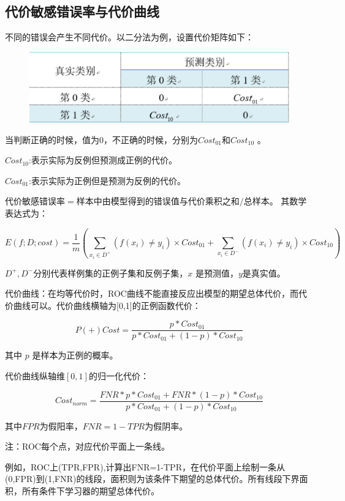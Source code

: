 \subsection{代价敏感错误率与代价曲线}

不同的错误会产生不同代价。以二分法为例，设置代价矩阵如下：

 \begin{figure}[h]
   \centering
   \includegraphics[width=.7\textwidth]{imgs/2-1.eps}
 \end{figure}

当判断正确的时候，值为$0$，不正确的时候，分别为$Cost_{01}$和$Cost_{10}$ 。

$Cost_{10}$:表示实际为反例但预测成正例的代价。

$Cost_{01}$:表示实际为正例但是预测为反例的代价。


$\mbox{代价敏感错误率} = \mbox{样本中由模型得到的错误值与代价乘积之和}/\mbox{总样本}$。 其数学表达式为：

$$
E(f;D;cost)=\frac{1}{m}\left( \sum_{x_{i} \in D^{+}}({f(x_i)\neq y_i})\times Cost_{01}+ \sum_{x_{i} \in D^{-}}({f(x_i)\neq y_i})\times Cost_{10}\right)
$$

$D^{+},D^{-}$分别代表样例集的正例子集和反例子集，$x$ 是预测值，$y$是真实值。


代价曲线：在均等代价时，ROC曲线不能直接反应出模型的期望总体代价，而代价曲线可以。代价曲线横轴为[0,1]的正例函数代价：

$$
P(+)Cost=\frac{p*Cost_{01}}{p*Cost_{01}+(1-p)*Cost_{10}}
$$

其中 $p$ 是样本为正例的概率。

代价曲线纵轴维$[0,1]$的归一化代价：

$$
Cost_{norm}=\frac{FNR*p*Cost_{01}+FNR*(1-p)*Cost_{10}}{p*Cost_{01}+(1-p)*Cost_{10}}
$$

其中$FPR$为假阳率，$FNR=1-TPR$为假阴率。

注：ROC每个点，对应代价平面上一条线。

例如，ROC上(TPR,FPR),计算出FNR=1-TPR，在代价平面上绘制一条从(0,FPR)到(1,FNR)的线段，面积则为该条件下期望的总体代价。所有线段下界面积，所有条件下学习器的期望总体代价。

